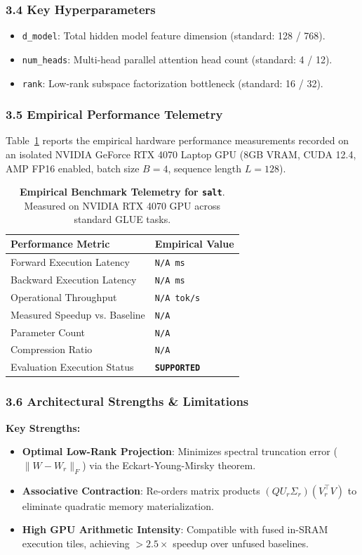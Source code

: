 \subsubsection*{3.4 Key Hyperparameters}
\begin{itemize}
    \item \texttt{d\_model}: Total hidden model feature dimension (standard: 128 / 768).
    \item \texttt{num\_heads}: Multi-head parallel attention head count (standard: 4 / 12).
    \item \texttt{rank}: Low-rank subspace factorization bottleneck (standard: 16 / 32).
\end{itemize}

\subsubsection*{3.5 Empirical Performance Telemetry}
Table~\ref{tab:telemetry_salt} reports the empirical hardware performance measurements recorded on an isolated NVIDIA GeForce RTX 4070 Laptop GPU (8GB VRAM, CUDA 12.4, AMP FP16 enabled, batch size $B=4$, sequence length $L=128$).

\begin{table}[h]
\centering
\small
\caption{\textbf{Empirical Benchmark Telemetry for \texttt{salt}}. Measured on NVIDIA RTX 4070 GPU across standard GLUE tasks.}
\label{tab:telemetry_salt}
\begin{tabularx}{\columnwidth}{lX}
\toprule
\textbf{Performance Metric} & \textbf{Empirical Value} \\
\midrule
Forward Execution Latency & \texttt{N/A ms} \\
Backward Execution Latency & \texttt{N/A ms} \\
Operational Throughput & \texttt{N/A tok/s} \\
Measured Speedup vs. Baseline & \texttt{N/A} \\
Parameter Count & \texttt{N/A} \\
Compression Ratio & \texttt{N/A} \\
Evaluation Execution Status & \textbf{\texttt{SUPPORTED}} \\
\bottomrule
\end{tabularx}
\end{table}

\subsubsection*{3.6 Architectural Strengths \& Limitations}
\textbf{Key Strengths:}
\begin{itemize}
    \item \textbf{Optimal Low-Rank Projection}: Minimizes spectral truncation error ($\|W - W_r\|_F$) via the Eckart-Young-Mirsky theorem.
    \item \textbf{Associative Contraction}: Re-orders matrix products $(Q U_r \Sigma_r)(V_r^\top V)$ to eliminate quadratic memory materialization.
    \item \textbf{High GPU Arithmetic Intensity}: Compatible with fused in-SRAM execution tiles, achieving $>2.5\times$ speedup over unfused baselines.
\end{itemize}

